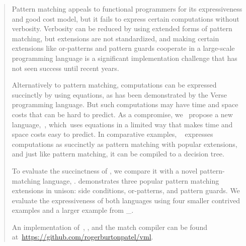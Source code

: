 \documentclass[manuscript,screen,12pt, nonacm]{acmart}
\begin{document}
\begin{abstract}
    Pattern matching %
    appeals %
    to functional programmers for its expressiveness and good cost model, 
    but 
    it %
    fails to express %
    certain computations without verbosity. Verbosity %
    can be reduced %
    by using extended forms of pattern matching,
    but extensions %
    are %
    not standardized, and making certain extensions like or-patterns and pattern
    guards cooperate in a large-scale programming language is a significant
    implementation challenge that has not seen success until recent years. 
    
    
    Alternatively to pattern matching, computations can be expressed succinctly
    by using equations, as has been demonstrated by the Verse programming
    language. But such computations may have time and space costs that can be
    hard to predict. 
    As a compromise, 
    we %
    ~propose %
    a new language,~\VMinus, %
    which~uses equations in a limited way that makes time and space costs easy
    to predict. 
    In
    comparative examples,
    \VMinus~ %
    expresses %
    computations as succinctly as pattern matching with popular extensions, and just like pattern matching, it %
    can be compiled %
    to a decision tree. 
    
    To evaluate %
    the succinctness of \VMinus,
    we compare %
    it with a novel pattern-matching language, \PPlus. \PPlus
    demonstrates  %
    three popular pattern matching extensions 
    in unison: side conditions, or-patterns, and pattern guards. 
    We evaluate %
    the expressiveness of both languages using four smaller contrived examples 
    and a larger example from \_. 

    An implementation of~\VMinus, \PPlus, and the match compiler can be found
    at~\url{https://github.com/rogerburtonpatel/vml}.
\end{abstract}
\end{document}
